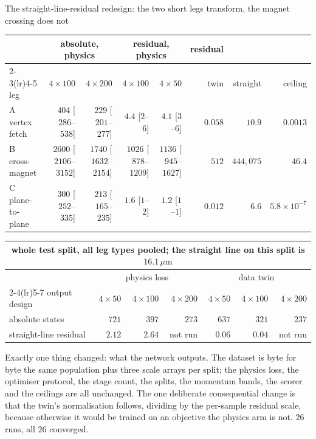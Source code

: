 \documentclass[aspectratio=169,10pt]{beamer}
\newcommand{\um}{\ensuremath{\,\mu\mathrm{m}}}
\newcommand{\hl}[1]{{\color{accent}\textbf{#1}}}
\newcommand{\bad}[1]{{\color{warm}\textbf{#1}}}
\begin{document}
\begin{frame}[shrink=25]{The straight-line-residual redesign: the two short legs transform, the magnet crossing does not}
  \vspace{2mm}
  \centering\small
  \begin{tabular}{@{}lrrrrrrr@{}}
    \toprule
    & \multicolumn{2}{c}{absolute, physics} & \multicolumn{2}{c}{residual, physics}
    & residual & & \\
    \cmidrule(lr){2-3}\cmidrule(lr){4-5}
    leg & $4{\times}100$ & $4{\times}200$ & $4{\times}100$ & $4{\times}50$ & twin & straight & ceiling \\
    \midrule
    A vertex fetch  & $404$ [$286$--$538$]    & $229$ [$201$--$277$]
                    & \hl{$4.4$} [$2$--$6$]   & $4.1$ [$3$--$6$]
                    & $0.058$ & $10.9$ & $0.0013$ \\
    B cross-magnet  & $2600$ [$2106$--$3152$] & $1740$ [$1632$--$2154$]
                    & \bad{$1026$} [$878$--$1209$] & $1136$ [$945$--$1627$]
                    & $512$ & $444{,}075$ & $46.4$ \\
    C plane-to-plane& $300$ [$252$--$335$]    & $213$ [$165$--$235$]
                    & \hl{$1.6$} [$1$--$2$]   & $1.2$ [$1$--$1$]
                    & $0.012$ & $6.6$ & $5.8\times10^{-7}$ \\
    \bottomrule
  \end{tabular}
  \vspace{2mm}

  \centering\small
  \begin{tabular}{@{}lrrrrrr@{}}
    \multicolumn{7}{c}{\textbf{whole test split, all leg types pooled; the straight line on this split is $16.1\um$}}\\
    \toprule
    & \multicolumn{3}{c}{physics loss} & \multicolumn{3}{c}{data twin} \\
    \cmidrule(lr){2-4}\cmidrule(lr){5-7}
    output design & $4\times50$ & $4\times100$ & $4\times200$ & $4\times50$ & $4\times100$ & $4\times200$ \\
    \midrule
    absolute states & $721$ & $397$ & $273$ & $637$ & $321$ & $237$ \\
    straight-line residual & \hl{$2.12$} & \hl{$2.64$} & not run & $0.06$ & $0.04$ & not run \\
    \bottomrule
  \end{tabular}
  \vspace{2mm}

  {\scriptsize Exactly one thing changed: what the network outputs. The dataset
   is byte for byte the same population plus three scale arrays per split; the
   physics loss, the optimiser protocol, the stage count, the splits, the
   momentum bands, the scorer and the ceilings are all unchanged. The one
   deliberate consequential change is that the twin's normalisation follows,
   dividing by the per-sample residual scale, because otherwise it would be
   trained on an objective the physics arm is not. $26$ runs, all $26$
   converged.}
\end{frame}
\end{document}
